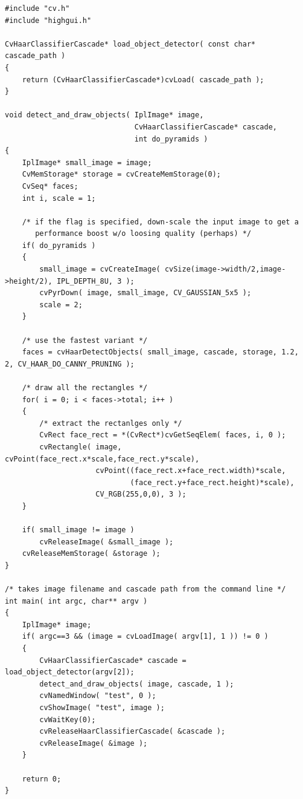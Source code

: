 \ifC
\begin{lstlisting}
#include "cv.h"
#include "highgui.h"

CvHaarClassifierCascade* load_object_detector( const char* cascade_path )
{
    return (CvHaarClassifierCascade*)cvLoad( cascade_path );
}

void detect_and_draw_objects( IplImage* image,
                              CvHaarClassifierCascade* cascade,
                              int do_pyramids )
{
    IplImage* small_image = image;
    CvMemStorage* storage = cvCreateMemStorage(0);
    CvSeq* faces;
    int i, scale = 1;

    /* if the flag is specified, down-scale the input image to get a
       performance boost w/o loosing quality (perhaps) */
    if( do_pyramids )
    {
        small_image = cvCreateImage( cvSize(image->width/2,image->height/2), IPL_DEPTH_8U, 3 );
        cvPyrDown( image, small_image, CV_GAUSSIAN_5x5 );
        scale = 2;
    }

    /* use the fastest variant */
    faces = cvHaarDetectObjects( small_image, cascade, storage, 1.2, 2, CV_HAAR_DO_CANNY_PRUNING );

    /* draw all the rectangles */
    for( i = 0; i < faces->total; i++ )
    {
        /* extract the rectanlges only */
        CvRect face_rect = *(CvRect*)cvGetSeqElem( faces, i, 0 );
        cvRectangle( image, cvPoint(face_rect.x*scale,face_rect.y*scale),
                     cvPoint((face_rect.x+face_rect.width)*scale,
                             (face_rect.y+face_rect.height)*scale),
                     CV_RGB(255,0,0), 3 );
    }

    if( small_image != image )
        cvReleaseImage( &small_image );
    cvReleaseMemStorage( &storage );
}

/* takes image filename and cascade path from the command line */
int main( int argc, char** argv )
{
    IplImage* image;
    if( argc==3 && (image = cvLoadImage( argv[1], 1 )) != 0 )
    {
        CvHaarClassifierCascade* cascade = load_object_detector(argv[2]);
        detect_and_draw_objects( image, cascade, 1 );
        cvNamedWindow( "test", 0 );
        cvShowImage( "test", image );
        cvWaitKey(0);
        cvReleaseHaarClassifierCascade( &cascade );
        cvReleaseImage( &image );
    }

    return 0;
}
\end{lstlisting}

\label{SetImagesForHaarClassifierCascade}

